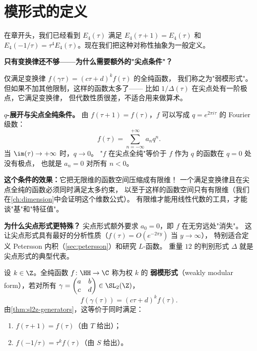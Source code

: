 \section{模形式的定义}
\label{sec:modular-forms-def}

在章开头，我们已经看到 $E_4(\tau)$ 满足 $E_4(\tau+1) = E_4(\tau)$ 和
$E_4(-1/\tau) = \tau^4 E_4(\tau)$。现在我们把这种对称性抽象为一般定义。

\textbf{只有变换律还不够——为什么需要额外的"尖点条件"？}

仅满足变换律 $f(\gamma\tau) = (c\tau+d)^k f(\tau)$ 的全纯函数，
我们称之为"弱模形式"。但如果不加其他限制，这样的函数太多了——
比如 $1/\Delta(\tau)$ 在尖点处有一阶极点，它满足变换律，
但代数性质很差，不适合用来做算术。

\textbf{$q$-展开与尖点全纯条件。}
由 $f(\tau+1) = f(\tau)$，$f$ 可以写成 $q = e^{2\pi i\tau}$ 的 Fourier 级数：
\[
  f(\tau) = \sum_{n=-\infty}^{+\infty} a_n q^n.
\]
当 $\im(\tau) \to +\infty$ 时，$q \to 0$。
"$f$ 在尖点全纯"等价于 $f$ 作为 $q$ 的函数在 $q=0$ 处没有极点，
也就是 $a_n = 0$ 对所有 $n < 0$。

\textbf{这个条件的效果：}它把无限维的函数空间压缩成有限维！
一个满足变换律且在尖点全纯的函数必须同时满足太多约束，
以至于这样的函数空间只有有限维（我们在\cref{ch:dimension}中会证明这个维数公式）。
有限维才能用线性代数的工具，才能谈"基"和"特征值"。

\textbf{为什么尖点形式更特殊？}
尖点形式额外要求 $a_0 = 0$，即 $f$ 在无穷远处"消失"。
这让尖点形式具有最好的分析性质（$f(\tau) = O(e^{-2\pi y})$ 当 $y\to\infty$），
特别适合定义 Petersson 内积（\cref{sec:petersson}）和研究 $L$-函数。
重量 $12$ 的判别形式 $\Delta$ 就是尖点形式的典型代表。

\begin{definition}[权 $k$ 的弱模形式]
\label{def:weakly-modular}
设 $k \in \Z$。全纯函数 $f\colon \HH \to \C$ 称为权 $k$ 的
\textbf{弱模形式}（weakly modular form），若对所有
$\gamma = \begin{pmatrix} a & b \\ c & d \end{pmatrix} \in \SL_2(\Z)$，
\[
  f(\gamma(\tau)) = (c\tau + d)^k f(\tau).
\]
由\cref{thm:sl2z-generators}，这等价于同时满足：
\begin{enumerate}
  \item $f(\tau + 1) = f(\tau)$（由 $T$ 给出）；
  \item $f(-1/\tau) = \tau^k f(\tau)$（由 $S$ 给出）。
\end{enumerate}
\end{definition}

